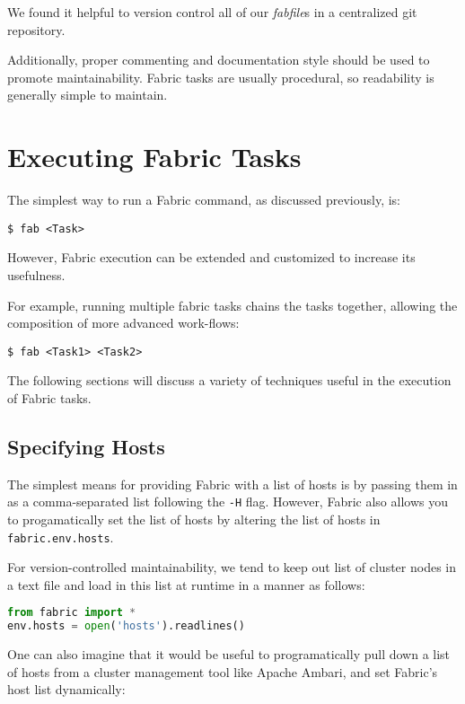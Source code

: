 \documentclass[9pt,twocolumn,twoside]{idsi}
\begin{document}
We found it helpful to version control all of our \emph{fabfile}s in a centralized git repository.

Additionally, proper commenting and documentation style should be used to promote maintainability. Fabric tasks are usually procedural, so readability is generally simple to maintain.

\section{Executing Fabric Tasks}
The simplest way to run a Fabric command, as discussed previously, is:
\begin{verbatim}
$ fab <Task>
\end{verbatim}

However, Fabric execution can be extended and customized to increase its usefulness.

For example, running multiple fabric tasks chains the tasks together, allowing the composition of more advanced work-flows:
\begin{verbatim}
$ fab <Task1> <Task2>
\end{verbatim}

The following sections will discuss a variety of techniques useful in the execution of Fabric tasks. 

\subsection{Specifying Hosts}
The simplest means for providing Fabric with a list of hosts is by passing them in as a comma-separated list following the \texttt{-H} flag. However, Fabric also allows you to progamatically set the list of hosts by altering the list of hosts in \texttt{fabric.env.hosts}.

For version-controlled maintainability, we tend to keep out list of cluster nodes in a text file and load in this list at runtime in a manner as follows:
\begin{lstlisting}[language=Python, showstringspaces=false]
from fabric import *
env.hosts = open('hosts').readlines()
\end{lstlisting}

One can also imagine that it would be useful to programatically pull down a list of hosts from a cluster management tool like Apache Ambari, and set Fabric's host list dynamically:
\end{document}
